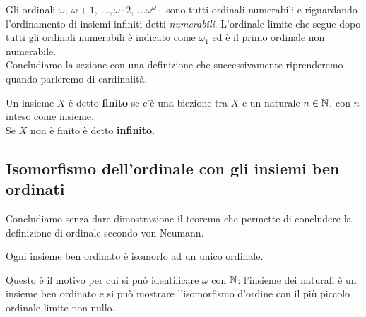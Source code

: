 Gli ordinali $\omega,\ \omega+1,\ \ldots, \omega\cdot 2,\ \ldots \omega^{\omega}\cdot $ sono tutti ordinali numerabili e riguardando l'ordinamento di insiemi infiniti detti \textit{numerabili}. L'ordinale limite che segue dopo tutti gli ordinali numerabili è indicato come $\omega_1$ ed è il primo ordinale non numerabile.\\ 
Concludiamo la sezione con una definizione che successivamente riprenderemo quando parleremo di cardinalità.
\begin{define}
	Un insieme $X$ è detto \textbf{finito} se c'è una biezione tra $X$ e un naturale $n\in\mathbb{N}$, con $n$ inteso come insieme.\\
	Se $X$ non è finito è detto \textbf{infinito}.
\end{define}
\subsection{Isomorfismo dell'ordinale con gli insiemi ben ordinati}
Concludiamo senza dare dimostrazione il teorema che permette di concludere la definizione di ordinale secondo von Neumann.
\begin{theoremaqed}
	Ogni insieme ben ordinato è isomorfo ad un unico ordinale.
\end{theoremaqed}
Questo è il motivo per cui si può identificare $\omega$ con $\mathbb{N}$: l'insieme dei naturali è un insieme ben ordinato e si può mostrare l'isomorfismo d'ordine con il più piccolo ordinale limite non nullo.
